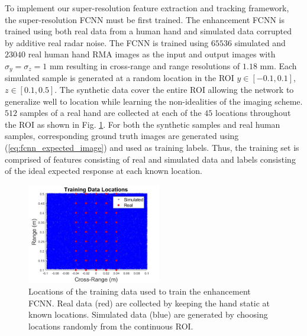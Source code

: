 \documentclass[10pt,journal,final]{IEEEtran}
\begin{document}
To implement our super-resolution feature extraction and tracking framework, the super-resolution FCNN must be first trained.
The enhancement FCNN is trained using both real data from a human hand and simulated data corrupted by additive real radar noise. 
The FCNN is trained using $65536$ simulated and $23040$ real human hand RMA images as the input and output images with $\sigma_y = \sigma_z = 1$ mm resulting in cross-range and range resolutions of $1.18$ mm. 
Each simulated sample is generated at a random location in the ROI $y \in [-0.1,0.1]$, $z \in [0.1,0.5]$.
The synthetic data cover the entire ROI allowing the network to generalize well to location while learning the non-idealities of the imaging scheme.
$512$ samples of a real hand are collected at each of the $45$ locations throughout the ROI as shown in Fig. \ref{fig:fcnn_training_locations}.
For both the synthetic samples and real human samples, corresponding ground truth images are generated using (\ref{eq:fcnn_expected_image}) and used as training labels.
Thus, the training set is comprised of features consisting of real and simulated data and labels consisting of the ideal expected response at each known location.

\begin{figure}[h]
	\centering
	\includegraphics[width=2.3in]{smith5.jpg}
	\caption{Locations of the training data used to train the enhancement FCNN. Real data (red) are collected by keeping the hand static at known locations. Simulated data (blue) are generated by choosing locations randomly from the continuous ROI.}
	\label{fig:fcnn_training_locations}
\end{figure}
\end{document}
